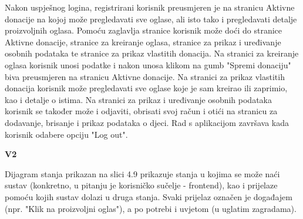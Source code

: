 			Nakon uspješnog logina, registrirani korisnik preusmjeren je na stranicu Aktivne donacije na kojoj može pregledavati sve oglase, ali isto tako i pregledavati detalje proizvoljnih oglasa. Pomoću zaglavlja stranice korisnik može doći do stranice Aktivne donacije, stranice za kreiranje oglasa, stranice za prikaz i uređivanje osobnih podataka te stranice za prikaz vlastitih donacija. Na stranici za kreiranje oglasa korisnik unosi podatke i nakon unosa klikom na gumb "Spremi donaciju" biva preusmjeren na stranicu Aktivne donacije. Na stranici za prikaz vlastitih donacija korisnik može pregledavati sve oglase koje je sam kreirao ili zaprimio, kao i detalje o istima. Na stranici za prikaz i uređivanje osobnih podataka korisnik se također može i odjaviti, obrisati svoj račun i otići na stranicu za dodavanje, brisanje i prikaz podataka o djeci. Rad s aplikacijom završava kada korisnik odabere opciju "Log out".

                \eject
                \textbf{V2}

                Dijagram stanja prikazan na slici 4.9 prikazuje stanja u kojima se može naći sustav (konkretno, u pitanju je korisničko sučelje - frontend), kao i prijelaze pomoću kojih sustav dolazi u druga stanja. Svaki prijelaz označen je događajem (npr. "Klik na proizvoljni oglas"), a po potrebi i uvjetom (u uglatim zagradama). \\

